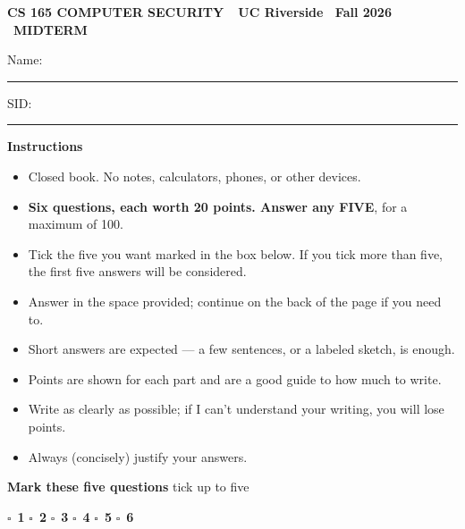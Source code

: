 \documentclass[11pt]{article}
\newif\ifcomment
\newcommand{\solutionstag}{\quad\textcolor{ucrgold}{\bfseries Solutions}}
\newcommand{\solutionstag}{}
\begin{document}
\thispagestyle{first}

{\color{ucrblue}\small\bfseries\MakeUppercase{CS 165 Computer Security}\ \textcolor{muted}{\textbullet\ UC Riverside \textbullet\ Fall 2026}} \textbullet\ {\color{ucrblue}\small\bfseries\MakeUppercase{Midterm}}\par
\vspace{6pt}
\vspace{7pt}

\ifcomment\else
{\large Name: \rule{7cm}{0.5pt}\qquad SID: \rule{4cm}{0.5pt}}\par
\vspace{10pt}
\fi

\textbf{Instructions}
\begin{itemize}[leftmargin=1.4em,itemsep=2pt,topsep=4pt]
  \item Closed book. No notes, calculators, phones, or other devices.
  \item \textbf{Six questions, each worth 20 points. Answer any FIVE}, for a maximum of 100.
  \item Tick the five you want marked in the box below. If you tick more than five, the first five answers will be considered.
  \item Answer in the space provided; continue on the back of the page if you need to.
  \item Short answers are expected --- a few sentences, or a labeled sketch, is enough.
  \item Points are shown for each part and are a good guide to how much to write.
  \item Write as clearly as possible; if I can't understand your writing, you will lose points.
  \item Always (concisely) justify your answers.
\end{itemize}

\begin{tcolorbox}[enhanced, colback=white, colframe=ucrblue, boxrule=0.9pt, arc=3pt,
  left=10pt, right=10pt, top=7pt, bottom=7pt, before skip=10pt, after skip=10pt]
{\bfseries Mark these five questions} \hfill {\small\color{muted}tick up to five}\par\vspace{6pt}
{\large $\square$\ \textbf{1} \hfill $\square$\ \textbf{2} \hfill $\square$\ \textbf{3} \hfill $\square$\ \textbf{4} \hfill $\square$\ \textbf{5} \hfill $\square$\ \textbf{6}}\par
{}
\end{tcolorbox}
\end{document}
